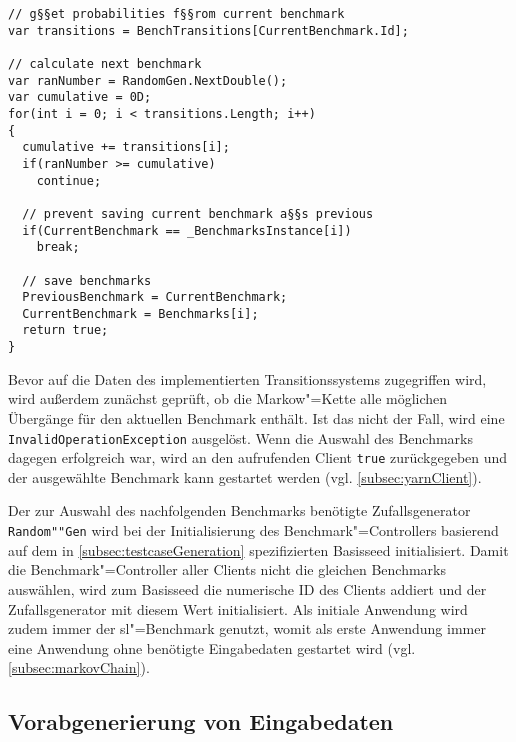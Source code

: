 \begin{lstlisting}[label=lst:benchmarkChanging,style=cs,
caption={[Auswahl des nachfolgenden Benchmarks]
    Auswahl des nachfolgenden Benchmarks (gekürzt).
    Dies stellt einen Ausschnitt der Methode \texttt{ChangeBenchmark()} dar, welche vom Client zur Bestimmung des nachfolgenden Benchmarks aufgerufen wird (vgl. \cref{subsec:yarnClient}).}]
// g§§et probabilities f§§rom current benchmark
var transitions = BenchTransitions[CurrentBenchmark.Id];

// calculate next benchmark
var ranNumber = RandomGen.NextDouble();
var cumulative = 0D;
for(int i = 0; i < transitions.Length; i++)
{
  cumulative += transitions[i];
  if(ranNumber >= cumulative)
    continue;
  
  // prevent saving current benchmark a§§s previous
  if(CurrentBenchmark == _BenchmarksInstance[i])
    break;
  
  // save benchmarks
  PreviousBenchmark = CurrentBenchmark;
  CurrentBenchmark = Benchmarks[i];
  return true;
}
\end{lstlisting}

Bevor auf die Daten des implementierten Transitionssystems zugegriffen wird, wird außerdem zunächst geprüft, ob die Markow"=Kette alle möglichen Übergänge für den aktuellen Benchmark enthält.
Ist das nicht der Fall, wird eine \texttt{InvalidOperationException} ausgelöst.
Wenn die Auswahl des Benchmarks dagegen erfolgreich war, wird an den aufrufenden Client \texttt{true} zurückgegeben und der ausgewählte Benchmark kann gestartet werden (vgl. \cref{subsec:yarnClient}).

Der zur Auswahl des nachfolgenden Benchmarks benötigte Zufallsgenerator \texttt{Random""Gen} wird bei der Initialisierung des Benchmark"=Controllers basierend auf dem in \cref{subsec:testcaseGeneration} spezifizierten Basisseed initialisiert.
Damit die Benchmark"=Controller aller Clients nicht die gleichen Benchmarks auswählen, wird zum Basisseed die numerische ID des Clients addiert und der Zufallsgenerator mit diesem Wert initialisiert.
Als initiale \gls{Anwendung} wird zudem immer der \acrlong{sl}"=Benchmark genutzt, womit als erste \gls{Anwendung} immer eine \gls{Anwendung} ohne benötigte Eingabedaten gestartet wird (vgl. \cref{subsec:markovChain}).

\subsection{Vorabgenerierung von Eingabedaten}
\label{subsec:precreateInputData}

